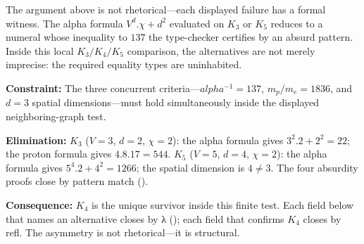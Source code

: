 \documentclass[11pt,a4paper]{book}
\def\alpha{alpha}%
\def\cdot{.}%
\def\texttt#1{#1}%
\begin{document}
The argument above is not rhetorical---each displayed failure has a formal witness. The alpha formula $V^d \cdot \chi + d^2$ evaluated on $K_3$ or $K_5$ reduces to a numeral whose inequality to $137$ the type-checker certifies by an absurd pattern. Inside this local $K_3/K_4/K_5$ comparison, the alternatives are not merely imprecise: the required equality types are uninhabited.

\textbf{Constraint:} The three concurrent criteria---$\alpha^{-1} = 137$, $m_p/m_e = 1836$, and $d = 3$ spatial dimensions---must hold simultaneously inside the displayed neighboring-graph test.

\textbf{Elimination:} $K_3$ ($V{=}3$, $d{=}2$, $\chi{=}2$): the alpha formula gives $3^2 \cdot 2 + 2^2 = 22$; the proton formula gives $4 \cdot 8 \cdot 17 = 544$. $K_5$ ($V{=}5$, $d{=}4$, $\chi{=}2$): the alpha formula gives $5^4 \cdot 2 + 4^2 = 1266$; the spatial dimension is $4 \neq 3$. The four absurdity proofs close by pattern match \texttt{()}.

\textbf{Consequence:} $K_4$ is the unique survivor inside this finite test. Each field below that names an alternative closes by \texttt{λ ()}; each field that confirms $K_4$ closes by \texttt{refl}. The asymmetry is not rhetorical---it is structural.
\end{document}
